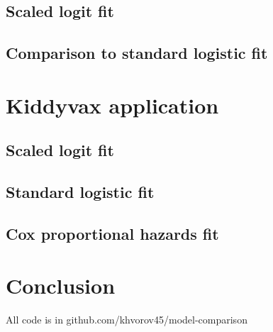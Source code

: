 \documentclass[12pt]{article}
\begin{document}
\subsection{Scaled logit fit}



\subsection{Comparison to standard logistic fit}



\section{Kiddyvax application}



\subsection{Scaled logit fit}



\subsection{Standard logistic fit}



\subsection{Cox proportional hazards fit}



\section{Conclusion}



\pagebreak

All code is in github.com/khvorov45/model-comparison
\end{document}
